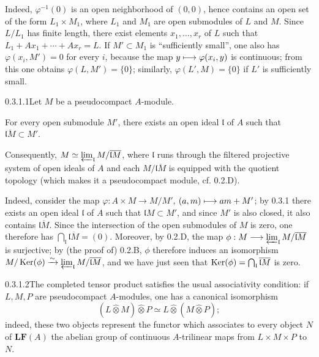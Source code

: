 Indeed, $\varphi^{-1}(0)$ is an open neighborhood of $(0,0)$, hence contains an open set of the form $L_1\times M_1$, where $L_1$ and $M_1$ are open submodules of $L$ and $M$. Since $L/L_1$ has finite length, there exist elements $x_1,\ldots,x_r$ of $L$ such that $L_1+Ax_1+\cdots+Ax_r=L$. If $M'\subset M_1$ is ``sufficiently small'', one also has $\varphi(x_i,M')=0$ for every $i$, because the map $y\mto\varphi(x_i,y)$ is continuous; from this one obtains $\varphi(L,M')=\{0\}$; similarly, $\varphi(L',M)=\{0\}$ if $L'$ is sufficiently small.

\begin{corollary}{0.3.1.1}\label{VIIB.0.3.1.1}Let $M$ be a pseudocompact $A$-module.
\begin{enumeratei}
\item For every open submodule $M'$, there exists an open ideal $\mathfrak l$ of $A$ such that $\overline{\mathfrak lM}\subset M'$.
\item Consequently, $M\simeq\varprojlim_{\mathfrak l}M/\overline{\mathfrak lM}$, where $\mathfrak l$ runs through the filtered projective system of open ideals of $A$ and each $M/\overline{\mathfrak lM}$ is equipped with the quotient topology (which makes it a pseudocompact module, cf. 0.2.D).
\end{enumeratei}
\end{corollary}
Indeed, consider the map $\varphi:A\times M\to M/M'$, $(a,m)\mto am+M'$; by 0.3.1 there exists an open ideal $\mathfrak l$ of $A$ such that $\mathfrak lM\subset M'$, and since $M'$ is also closed, it also contains $\overline{\mathfrak lM}$. Since the intersection of the open submodules of $M$ is zero, one therefore has $\bigcap_{\mathfrak l}\overline{\mathfrak lM}=(0)$. Moreover, by 0.2.D, the map $\phi:M\to\varprojlim_{\mathfrak l}M/\overline{\mathfrak lM}$ is surjective; by (the proof of) 0.2.B, $\phi$ therefore induces an isomorphism $M/\Ker(\phi)\isomto\varprojlim_{\mathfrak l}M/\overline{\mathfrak lM}$, and we have just seen that $\Ker(\phi)=\bigcap_{\mathfrak l}\overline{\mathfrak lM}$ is zero.

\begin{remark}{0.3.1.2}\label{VIIB.0.3.1.2}The completed tensor product satisfies the usual associativity condition: if $L,M,P$ are pseudocompact $A$-modules, one has a canonical isomorphism
\[
(L\widehat\otimes M)\widehat\otimes P\simeq L\widehat\otimes(M\widehat\otimes P);
\]
indeed, these two objects represent the functor which associates to every object $N$ of $\mathbf{LF}(A)$ the abelian group of continuous $A$-trilinear maps from $L\times M\times P$ to $N$.
\end{remark}

